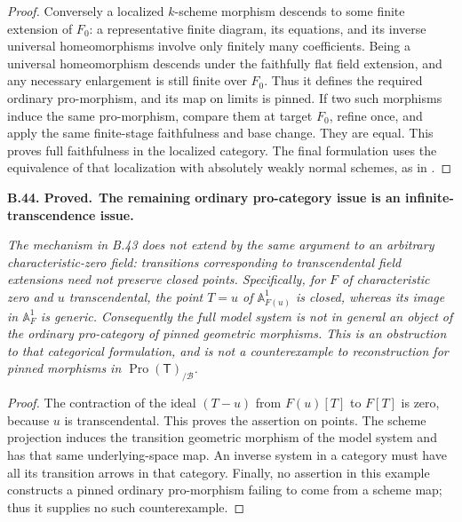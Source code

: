 \documentclass[11pt,a4paper]{article}
\newenvironment{claim}[3]{\par\medskip\noindent\hypertarget{#1}{\textbf{#1. #2.}}\ \textbf{#3.}\par\nopagebreak\smallskip\begingroup\itshape}{\endgroup\par\smallskip}
\begin{document}
\begin{proof}
Conversely a localized \(k\)-scheme morphism descends to some finite
extension of \(F_0\): a representative finite diagram, its equations,
and its inverse universal homeomorphisms involve only finitely many
coefficients. Being a universal homeomorphism descends under the
faithfully flat field extension, and any necessary enlargement is
still finite over \(F_0\). Thus it defines the required ordinary
pro-morphism, and its map on limits is pinned. If two such morphisms
induce the same pro-morphism, compare them at target \(F_0\), refine
once, and apply the same finite-stage faithfulness and base change.
They are equal. This proves full faithfulness in the localized
category. The final formulation uses the equivalence of that
localization with absolutely weakly normal schemes, as in
\citep[Theorem~1.13, Lemma~1.32, Proposition~2.28]{CarlsonHaineWolf2024}.
\end{proof}

\begin{claim}{B.44}{Proved}{The remaining ordinary pro-category issue is an infinite-transcendence issue}
The mechanism in B.43 does not extend by the same argument to an
arbitrary characteristic-zero field: transitions corresponding to
transcendental field extensions need not preserve closed points.
Specifically, for \(F\) of characteristic zero and \(u\) transcendental,
the point \(T=u\) of \(\mathbb A^1_{F(u)}\) is closed, whereas its
image in \(\mathbb A^1_F\) is generic. Consequently the full model
system is not in general an object of the ordinary pro-category of
pinned geometric morphisms. This is an obstruction to that categorical
formulation, and is not a counterexample to reconstruction for pinned
morphisms in \(\operatorname{Pro}(\mathsf T)_{/\mathcal B}\).
\end{claim}
\begin{proof}
The contraction of the ideal \((T-u)\) from \(F(u)[T]\) to \(F[T]\)
is zero, because \(u\) is transcendental. This proves the assertion
on points. The scheme projection induces the transition geometric
morphism of the model system and has that same underlying-space map.
An inverse system in a category must have all its transition arrows
in that category. Finally, no assertion in this example constructs
a pinned ordinary pro-morphism failing to come from a scheme map;
thus it supplies no such counterexample.
\end{proof}
\end{document}
